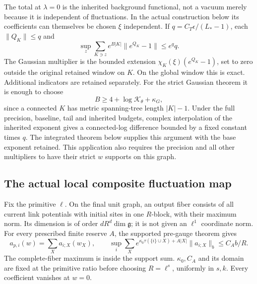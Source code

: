 The total at $\lambda=0$ is the inherited background
functional, not a vacuum merely because it is independent
of fluctuations. In the actual construction below its
coefficients can themselves be chosen $\xi$ independent.
If
$q=C_T\epsilon/(L_*-1)$, each $\|Q_K\|\le q$ and
\begin{equation}\label{cdj-multiplier}
 \sup_z\sum_{K\ni z}e^{B|K|}
                     \|e^{Q_K}-1\|\le e^q q.
\end{equation}
The Gaussian multiplier is the bounded extension
$\chi_K(\xi)(e^{Q_K}-1)$, set to zero outside the original
retained window on $K$. On the global window this is
exact. Additional indicators are retained separately.
For the strict Gaussian theorem it is enough to choose
\begin{equation}\label{cdj-Gaussian-weight}
 B\ge4+\log\mathcal K_\theta+\kappa_G,
\end{equation}
since a connected $K$ has metric spanning-tree length
$|K|-1$. Under the full precision, baseline, tail and inherited
budgets, complex interpolation of the inherited exponent gives
a connected-log difference bounded by a fixed constant times $q$.
The integrated theorem below supplies this argument with the
base exponent retained. This application also requires the
precision and all other multipliers to have their strict $w$
supports on this graph.

\subsection{The actual local composite fluctuation map}
\label{cdj-local-map-section}

Fix the primitive $\ell$. On the final unit graph, an output
fiber consists of all current link potentials with initial
sites in one $R$-block, with their maximum norm. Its dimension
is of order $dR^d\dim\mathfrak g$; it is not given an
$\ell^1$ coordinate norm. For every prescribed finite reserve
$A$, the supported pre-gauge theorem gives
\begin{equation}\label{cdj-ap-family}
 a_{p,i}(w)=\sum_Xa_{i;X}(w_X),\qquad
 \sup_i\sum_Xe^{\kappa_0\tau(\{i\}\cup X)+A|X|}
                       \|a_{i;X}\|_b\le C_A b/R.
\end{equation}
The complete-fiber maximum is inside the support sum.
$\kappa_0,C_A$ and its domain are fixed at the primitive
ratio before choosing $R=\ell^s$, uniformly in $s,k$.
Every coefficient vanishes at $w=0$.

